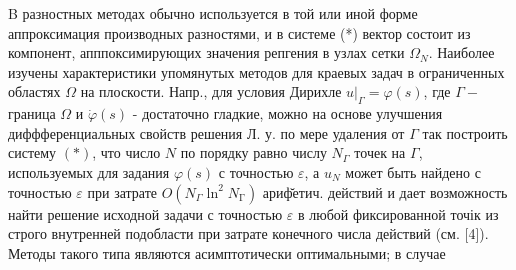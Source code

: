 \documentclass[10pt]{article}
\begin{document}
B разностных методах обычно используется в той или иной форме аппроксимация производных разностями, и в системе (*) вектор состоит из компонент, апппоксимирующих значения репгения в узлах сетки $\Omega_{N}$. Наиболее изучены характеристики упомянутых методов для краевых задач в ограниченных областях $\Omega$ на плоскости. Напр., для условия Дирихле $\left.u\right|_{\Gamma}=\varphi(s)$, где $\Gamma-$ граница $\Omega$ и $\dot{\varphi}(s)$ - достаточно гладкие, можно на основе улучшения диффференциальных свойств решения Л. у. по мере удаления от $\Gamma$ так построить систему $(*)$, что число $N$ по порядку равно числу $N_{\Gamma}$ точек на $\Gamma$, используемых для задания $\varphi(s)$ с точностью $\varepsilon$, а $u_{N}$ может быть найдено с точностью $\varepsilon$ при затрате $O\left(N_{\Gamma} \ln ^{2} N_{\mathrm{\Gamma}}\right)$ ариф̆етич. действий и дает возможность найти решение исходной задачи с точностью $\varepsilon$ в любой фиксированной точік из строго внутренней подобласти при затрате конечного числа действий (см. [4]). Методы такого типа являются асимптотически оптимальными; в случае
\end{document}
